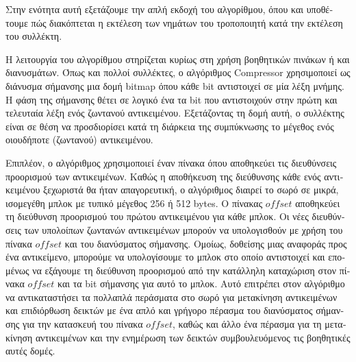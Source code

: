 \begin{greek}
Στην ενότητα αυτή εξετάζουμε την απλή εκδοχή του αλγορίθμου, όπου και υποθέτουμε πώς
διακόπτεται η εκτέλεση των νημάτων του τροποποιητή κατά την εκτέλεση του
συλλέκτη.

Η λειτουργία του αλγορίθμου στηρίζεται κυρίως στη χρήση βοηθητικών πινάκων ή και
διανυσμάτων. Όπως και πολλοί συλλέκτες, ο αλγόριθμος Compressor χρησιμοποιεί ως
διάνυσμα σήμανσης μια δομή bitmap όπου κάθε bit αντιστοιχεί σε μία λέξη μνήμης. 
Η φάση της σήμανσης θέτει σε λογικό ένα τα bit που αντιστοιχούν στην πρώτη και 
τελευταία λέξη ενός ζωντανού αντικειμένου. Εξετάζοντας τη δομή αυτή, ο συλλέκτης 
είναι σε θέση να προσδιορίσει κατά τη διάρκεια της συμπύκνωσης το μέγεθος ενός 
οιουδήποτε (ζωντανού) αντικειμένου.

Επιπλέον, ο αλγόριθμος χρησιμοποιεί έναν πίνακα όπου αποθηκεύει τις διευθύνσεις
προορισμού των αντικειμένων. Καθώς η αποθήκευση της διεύθυνσης κάθε ενός
αντικειμένου ξεχωριστά θα ήταν απαγορευτική, ο αλγόριθμος διαιρεί το σωρό σε
μικρά, ισομεγέθη μπλοκ με τυπικό μέγεθος 256 ή 512 bytes. Ο πίνακας $offset$
αποθηκεύει τη διεύθυνση προορισμού του πρώτου αντικειμένου για κάθε μπλοκ.
Οι νέες διευθύνσεις των υπολοίπων ζωντανών αντικειμένων μπορούν να υπολογισθούν
με χρήση του πίνακα $offset$ και του διανύσματος σήμανσης. Ομοίως, δοθείσης μιας 
αναφοράς προς ένα αντικείμενο, μπορούμε να υπολογίσουμε το μπλοκ στο οποίο
αντιστοιχεί και επομένως να εξάγουμε τη διεύθυνση προορισμού από την κατάλληλη
καταχώριση στον πίνακα $offset$ και τα bit σήμανσης για αυτό το μπλοκ. Αυτό
επιτρέπει στον αλγόριθμο να αντικαταστήσει τα πολλαπλά περάσματα στο σωρό για
μετακίνηση αντικειμένων και επιδιόρθωση δεικτών με ένα απλό και γρήγορο πέρασμα
του διανύσματος σήμανσης για την κατασκευή του πίνακα $offset$, καθώς και άλλο 
ένα πέρασμα για τη μετακίνηση αντικειμένων και την ενημέρωση των δεικτών 
συμβουλευόμενος τις βοηθητικές αυτές δομές.


\end{greek}
